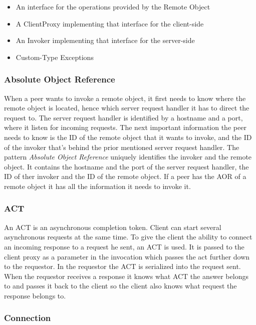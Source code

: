 \begin{itemize}\itemsep0pt
\item An interface for the operations provided by the Remote Object
\item A ClientProxy implementing that interface for the client-side
\item An Invoker implementing that interface for the server-side
\item Custom-Type Exceptions
\end{itemize}

\subsubsection{Absolute Object Reference}
When a peer wants to invoke a remote object, it first needs to know where the remote object is located, hence which server request handler it has to direct the request to. The server request handler is identified by a hostname and a port, where it listen for incoming requests. The next important information the peer needs to know is the ID of the remote object that it wants to invoke, and the ID of the invoker that's behind the prior mentioned server request handler. The pattern \textit{Absolute Object Reference} uniquely identifies the invoker and the remote object. It contains the hostname and the port of the server request handler, the ID of ther invoker and the ID of the remote object. If a peer has the AOR of a remote object it has all the information it needs to invoke it. 

\subsubsection{ACT}
An ACT is an asynchronous completion token. Client can start several asynchronous requests at the same time. To give the client the ability to connect an incoming response to a request he sent, an ACT is used. It is passed to the client proxy as a parameter in the invocation which passes the act further down to the requestor. In the requestor the ACT is serialized into the request sent. When the requestor receives a response it knows what ACT the answer belongs to and passes it back to the client so the client also knows what request the response belongs to. 

\subsubsection{Connection}

